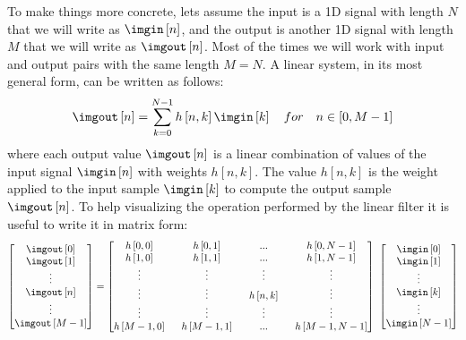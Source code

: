 To make things more concrete, lets assume the input is a 1D signal with length $N$ that we will write as $\imgin \left[n \right]$, and the output is another 1D signal with length $M$ that we will write as $\imgout \left[n \right]$. Most of the times we will work with input and output pairs with the same length $M=N$. A linear system, in its most general form, can be written as follows:
\begin{equation}
	\imgout \left[n \right] = \sum_{k=0}^{N-1} h \left[n,k\right] \imgin \left[k \right] ~~~ for ~~~ n \in \left[0, M-1 \right]
	\label{eq:general_lin_filter}
\end{equation}
where each output value $\imgout \left[n \right]$ is a linear combination of values of the input signal $\imgin \left[n \right]$ with weights $h \left[n,k\right]$. The value $h \left[n,k\right]$ is the weight applied to the input sample $\imgin \left[k \right]$ to compute the output sample $\imgout \left[n \right]$.
To help visualizing the operation performed by the linear filter it is useful to write it in matrix form:
\begin{equation*}
	\begin{bmatrix}
		\imgout\left[ 0 \right] \\
		\imgout\left[ 1 \right] \\
		\vdots                  \\
		\imgout\left[ n \right] \\
		\vdots                  \\
		\imgout\left[ M-1 \right]
	\end{bmatrix}
	=
	\begin{bmatrix}
		h\left[0,0\right] ~   & ~ h\left[0,1\right] ~   & ~ ... ~                 & ~ h\left[0,N-1\right]   \\
		h\left[1,0\right] ~   & ~ h\left[1,1\right] ~   & ~ ... ~                 & ~ h\left[1,N-1\right]   \\
		\vdots ~              & ~  \vdots ~             & ~  \vdots ~             & ~  \vdots               \\
		\vdots ~              & ~  \vdots ~             & ~  h \left[n,k\right] ~ & ~  \vdots               \\
		\vdots ~              & ~  \vdots ~             & ~  \vdots ~             & ~  \vdots               \\
		h\left[M-1,0\right] ~ & ~ h\left[M-1,1\right] ~ & ~ ... ~                 & ~ h\left[M-1,N-1\right]
	\end{bmatrix}
	~
	\begin{bmatrix}
		\imgin\left[0\right] \\
		\imgin\left[1\right] \\
		\vdots               \\
		\imgin\left[k\right] \\
		\vdots               \\
		\imgin\left[N-1\right]
	\end{bmatrix}
\end{equation*}
